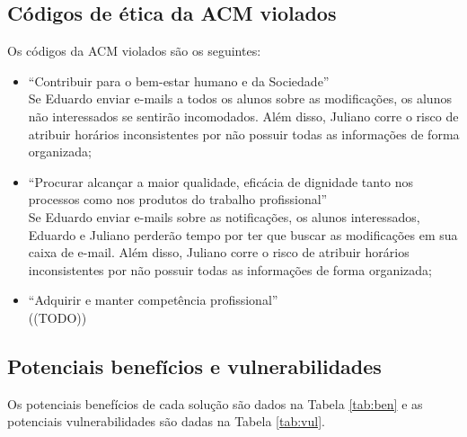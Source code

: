 \documentclass[a4paper,dvipdfm]{article}
\begin{document}
	\subsection{Códigos de ética da ACM violados}
		Os códigos da ACM violados são os seguintes:
		\begin{itemize}
			\item ``Contribuir para o bem-estar humano e da Sociedade''\\
				Se Eduardo enviar e-mails a todos os alunos sobre as modificações, os alunos não interessados se sentirão incomodados.
				Além disso, Juliano corre o risco de atribuir horários inconsistentes por não possuir todas as informações de forma organizada;
			\item ``Procurar alcançar a maior qualidade, eficácia de dignidade tanto nos processos como nos produtos do trabalho profissional''\\
				Se Eduardo enviar e-mails sobre as notificações, os alunos interessados, Eduardo e Juliano perderão tempo por ter que buscar as modificações em sua caixa de e-mail.
				Além disso, Juliano corre o risco de atribuir horários inconsistentes por não possuir todas as informações de forma organizada;
			\item ``Adquirir e manter competência profissional''\\
				((TODO))
				
		\end{itemize}

	\subsection{Potenciais benefícios e vulnerabilidades}
		Os potenciais benefícios de cada solução são dados na Tabela \ref{tab:ben} e as potenciais vulnerabilidades são dadas na Tabela \ref{tab:vul}.
\end{document}
